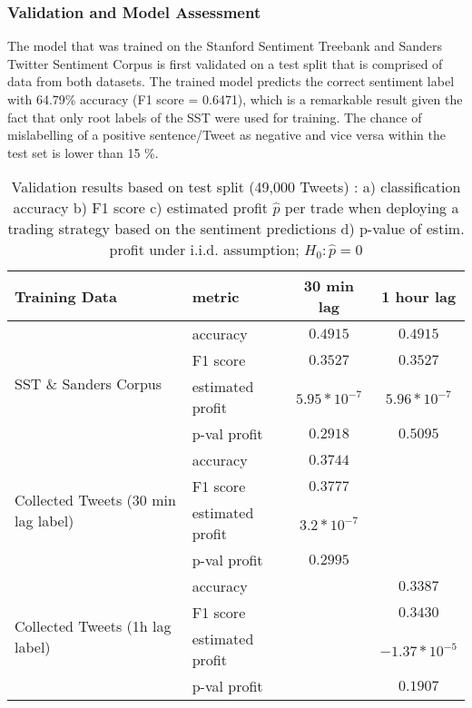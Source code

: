 \documentclass[a4paper,12pt]{article}%
\begin{document}
\subsubsection{Validation and Model Assessment}
The model that was trained on the Stanford Sentiment Treebank and Sanders Twitter Sentiment Corpus is first validated on a test split that is comprised of data from both datasets. The trained model predicts the correct sentiment label with 64.79\% accuracy (F1 score =  0.6471), which is a remarkable result given the fact that only root labels of the SST were used for training. The chance of mislabelling of a positive sentence/Tweet as negative and vice versa within the test set is lower than 15 \%.

\begin{table}
\centering
\captionsetup{justification=centering}
\begin{tabular}{ |l|l|c|c| }
\hline
Training Data & metric & 30 min lag & 1 hour lag \\ \hline
\multirow{4}{*}{SST \& Sanders Corpus} & accuracy & $0.4915$ & $0.4915$ \\
 & F1 score & $0.3527$ & $0.3527$ \\
 & estimated profit & $5.95 * 10^{-7}$ & $5.96* 10^{-7}$ \\
 & p-val profit & $0.2918$ & $0.5095$ \\ \hline
\multirow{4}{*}{Collected Tweets (30 min lag label)} & accuracy & $0.3744$ & \\
 & F1 score & $0.3777$ &  \\
 & estimated profit & $3.2 * 10^{-7}$ & \\
 & p-val profit & $0.2995$ &  \\ \hline
\multirow{4}{*}{Collected Tweets (1h lag label)} & accuracy & & $0.3387 $  \\
 & F1 score & & $0.3430$ \\
 & estimated profit & & $-1.37 * 10^{-5}$ \\
 & p-val profit & & $0.1907$ \\ \hline
\end{tabular}
\caption[Validation Metrics - Predicting Short-Term Stock Returns With A Tree-LSTM Network]{Validation results based on test split (49,000 Tweets) : a) classification accuracy b) F1 score c) estimated profit $\hat{p}$ per trade when deploying a trading strategy based on the sentiment predictions d) p-value of estim. profit under i.i.d. assumption; $H_0: \hat{p}=0$\label{table:tree_lstm_test}}
\end{table}
\end{document}
